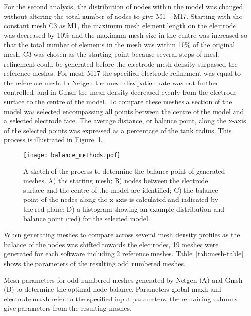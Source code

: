 \documentclass[12pt]{iopart}
\begin{document}
For the second analysis, the distribution of nodes within the 
model was changed without altering 
the total number of nodes to give M1 -- M17. 
Starting with the constant mesh C3 as M1, the maximum mesh element 
length on the electrode was decreased by 10\% and the maximum mesh size in the centre was
increased so that the total number of elements in the mesh was  within 10\% of the 
original mesh. C3 was chosen as the starting point because several steps of mesh 
refinement could be generated before the electrode mesh density surpassed the reference meshes. 
For mesh M17 the specified electrode refinement was equal to the reference mesh. 
In Netgen the mesh dissipation rate was not further controlled, and in Gmsh the mesh density 
decreased evenly from the electrode surface to the centre of the model. 
To compare these meshes a section of the model was selected
encompassing all points between the centre of the model and a selected electrode face.
The average 
distance, or balance point, along the x-axis of the selected points was expressed 
as a percentage of the tank radius.
This process is illustrated in Figure~\ref{fig:balanceMethods}.
 
\begin{figure}
  \texttt{[image: balance\_methods.pdf]}
  \caption{\label{fig:balanceMethods} A sketch of the process to determine the 
  balance point of generated meshes. A) the starting mesh; B) nodes between the
  electrode surface and the centre of the model are identified; C) the 
  balance point of the nodes along the x-axis is calculated and indicated 
  by the red plane; D) a histogram showing an example distribution and balance point (red)
  for the selected model.}
\end{figure}

When generating meshes to compare across several mesh density profiles as the balance of the nodes was shifted 
towards the electrodes, 19 meshes were generated for each software including 2 reference meshes. 
Table~\ref{tab:mesh-table} shows the parameters of the resulting odd numbered meshes. 

\begin{table}[]
\caption{\label{tab:mesh-table}Mesh parameters for odd numbered meshes generated by Netgen (A) and Gmsh (B) 
to determine the optimal 
node balance. Parameters global maxh and electrode maxh refer to the specified input parameters; the remaining 
columns give parameters from the resulting meshes.}

\end{table}
\end{document}
